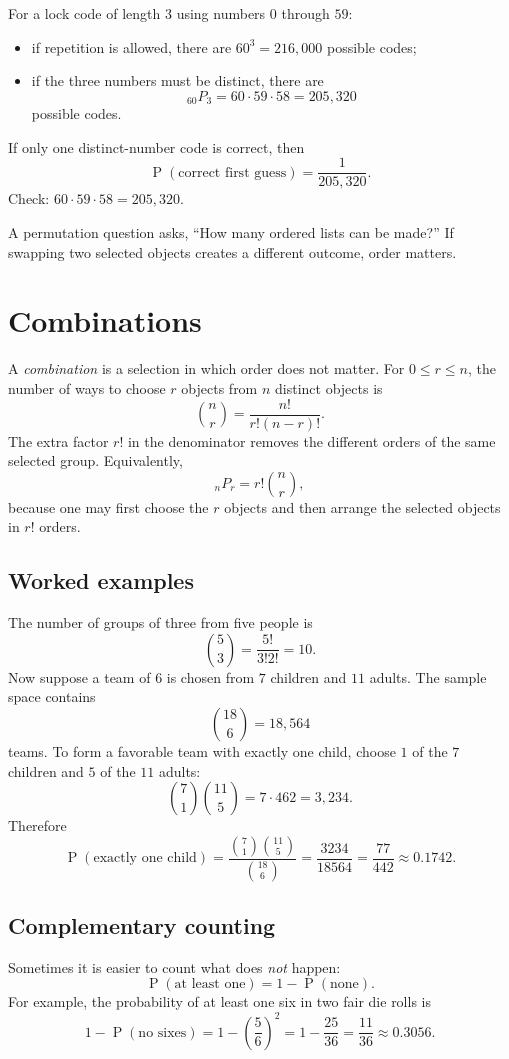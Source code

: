 \documentclass[11pt]{article}
\newcommand{\Pp}{\operatorname{P}}
\begin{document}
For a lock code of length $3$ using numbers $0$ through $59$:
\begin{itemize}
\item if repetition is allowed, there are $60^3=216{,}000$ possible codes;
\item if the three numbers must be distinct, there are
\[
{}_{60}P_3=60\cdot59\cdot58=205{,}320
\]
possible codes.
\end{itemize}
If only one distinct-number code is correct, then
\[
\Pp(\text{correct first guess})=\frac{1}{205{,}320}.
\]
Check: $60\cdot59\cdot58=205{,}320$.

\begin{keybox}
A permutation question asks, ``How many ordered lists can be made?''  If swapping
two selected objects creates a different outcome, order matters.
\end{keybox}

\section{Combinations}\label{sec:combinations}
A \emph{combination} is a selection in which order does not matter.  For
$0\leq r\leq n$, the number of ways to choose $r$ objects from $n$ distinct
objects is
\[
\binom{n}{r}=\frac{n!}{r!(n-r)!}.
\]
The extra factor $r!$ in the denominator removes the different orders of the
same selected group.  Equivalently,
\[
{}_nP_r=r!\binom{n}{r},
\]
because one may first choose the $r$ objects and then arrange the selected
objects in $r!$ orders.

\subsection{Worked examples}
The number of groups of three from five people is
\[
\binom{5}{3}=\frac{5!}{3!2!}=10.
\]
Now suppose a team of $6$ is chosen from $7$ children and $11$ adults.  The
sample space contains
\[
\binom{18}{6}=18{,}564
\]
teams.  To form a favorable team with exactly one child, choose $1$ of the $7$
children and $5$ of the $11$ adults:
\[
\binom{7}{1}\binom{11}{5}=7\cdot462=3{,}234.
\]
Therefore
\[
\Pp(\text{exactly one child})=
\frac{\binom{7}{1}\binom{11}{5}}{\binom{18}{6}}
=\frac{3234}{18564}=\frac{77}{442}\approx0.1742.
\]

\subsection{Complementary counting}
Sometimes it is easier to count what does \emph{not} happen:
\[
\Pp(\text{at least one})=1-\Pp(\text{none}).
\]
For example, the probability of at least one six in two fair die rolls is
\[
1-\Pp(\text{no sixes})=1-\left(\frac56\right)^2
=1-\frac{25}{36}=\frac{11}{36}\approx0.3056.
\]
\end{document}
